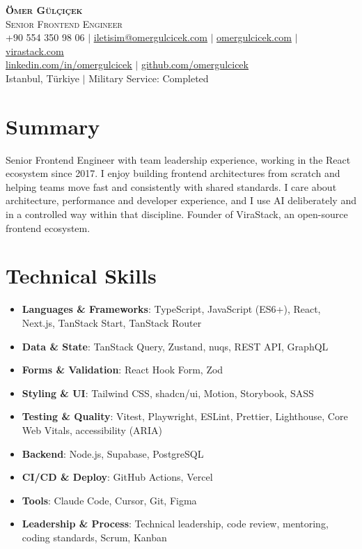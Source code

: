 \documentclass[a4paper,11pt]{article}
\begin{document}
\begin{center}
    \textbf{\Huge \scshape Ömer Gülçiçek} \\ \vspace{1pt}
    {\Large \scshape Senior Frontend Engineer} \\ \vspace{2pt}
    \small +90 554 350 98 06 $|$ \href{mailto:iletisim@omergulcicek.com}{\underline{iletisim@omergulcicek.com}} $|$ \href{https://omergulcicek.com/}{\underline{omergulcicek.com}} $|$ \href{https://virastack.com/}{\underline{virastack.com}} \\
    \small \href{https://linkedin.com/in/omergulcicek}{\underline{linkedin.com/in/omergulcicek}} $|$ \href{https://github.com/omergulcicek}{\underline{github.com/omergulcicek}} \\
    \small Istanbul, Türkiye $|$ Military Service: Completed
\end{center}

\section{Summary}
{\small
Senior Frontend Engineer with team leadership experience, working in the React ecosystem since 2017. I enjoy building frontend architectures from scratch and helping teams move fast and consistently with shared standards. I care about architecture, performance and developer experience, and I use AI deliberately and in a controlled way within that discipline. Founder of ViraStack, an open-source frontend ecosystem.\par
}

\section{Technical Skills}
 \begin{itemize}[leftmargin=0.15in, label={}, itemsep=0pt]
    \small
     \item \textbf{Languages \& Frameworks}: TypeScript, JavaScript (ES6+), React, Next.js, TanStack Start, TanStack Router
     \item \textbf{Data \& State}: TanStack Query, Zustand, nuqs, REST API, GraphQL
     \item \textbf{Forms \& Validation}: React Hook Form, Zod
     \item \textbf{Styling \& UI}: Tailwind CSS, shadcn/ui, Motion, Storybook, SASS
     \item \textbf{Testing \& Quality}: Vitest, Playwright, ESLint, Prettier, Lighthouse, Core Web Vitals, accessibility (ARIA)
     \item \textbf{Backend}: Node.js, Supabase, PostgreSQL
     \item \textbf{CI/CD \& Deploy}: GitHub Actions, Vercel
     \item \textbf{Tools}: Claude Code, Cursor, Git, Figma
     \item \textbf{Leadership \& Process}: Technical leadership, code review, mentoring, coding standards, Scrum, Kanban
 \end{itemize}
\end{document}
